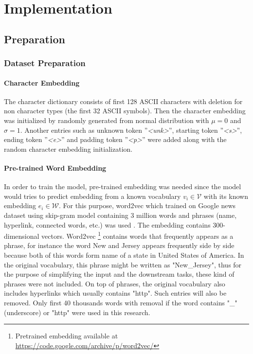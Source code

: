 \chapter{Implementation}
\label{chap:implementation}

\section{Preparation}
    \subsection{Dataset Preparation}
        \subsubsection{Character Embedding}
            The character dictionary consists of first 128 ASCII
            characters with deletion for non character types (the
            first 32 ASCII symbols). Then the character embedding was
            initialized by randomly generated from normal distribution
            with $\mu = 0$ and $\sigma = 1$. Another entries such as
            unknown token ''\textit{\textless unk\textgreater}'', starting
            token ''\textit{\textless s\textgreater}'', ending token
            ''\textit{\textless e\textgreater}'' and padding token
            ''\textit{\textless p\textgreater}'' were added along with the
            random character embedding initialization.

        \subsubsection{Pre-trained Word Embedding}
            In order to train the model, pre-trained embedding was
            needed since the model would tries to predict embedding
            from a known vocabulary $v_i \in \mathcal{V}$ with its known
            embedding $e_i \in \mathcal{W}$. For this purpose, word2vec
            which trained on Google news dataset using skip-gram model
            containing 3 million words and phrases (name, hyperlink,
            connected words, etc.) was used
            \citep{Distributed2013mikolov}. The embedding contains
            300-dimensional vectors. Word2vec \footnote{Pretrained
            embedding available at 
            \url{https://code.google.com/archive/p/word2vec/}}
            contains words that frequently appears as a phrase, for
            instance the word New and Jersey appears frequently side
            by side because both of this words form name of a state in
            United States of America. In the original vocabulary, this
            phrase might be written as "New\_Jersey", thus for the
            purpose of simplifying the input and the downstream tasks,
            these kind of phrases were not included. On top of phrases,
            the original vocabulary also includes hyperlinks which
            usually contains "http". Such entries will also be
            removed. Only first 40 thousands words with removal if the
            word contains "\_" (underscore) or "http" were used in this
            research.

